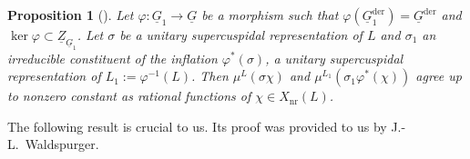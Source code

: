\documentclass[a4paper]{amsart}
\numberwithin{equation}{section}
\newtheorem{prop}[thm]{Proposition}
\theoremstyle{remark}
\theoremstyle{definition}
\newcommand{\alggrp}[1]{\underline{#1}}
\newcommand{\der}{\mathrm{der}}
\newcommand{\xnr}{X_{\mathrm{nr}}}
\begin{document}
\begin{prop}[{\cite[Proposition 2.2]{solleveld}}]\label{prop:solleveld}
  Let $\varphi\colon \alggrp G_{1}\to \alggrp G$ be a morphism such that $\varphi(\alggrp{G}_{1}^{\der}) = \alggrp{G}^{\der}$ and $\ker\varphi\subset \alggrp{Z}_{\alggrp G_{1}}$.
  Let $\sigma$ be a unitary supercuspidal representation of $L$ and $\sigma_1$ an irreducible constituent of the inflation $\varphi^*(\sigma)$, a unitary supercuspidal representation of $L_1 := \varphi^{-1}(L)$.
  Then $\mu^L(\sigma \chi)$ and $\mu^{L_1}(\sigma_1 \varphi^*(\chi))$ agree up to nonzero constant as rational functions of $\chi \in \xnr(L)$.
\end{prop}


The following result is crucial to us. Its proof was provided to us by J.-L.\ Waldspurger.
\end{document}
